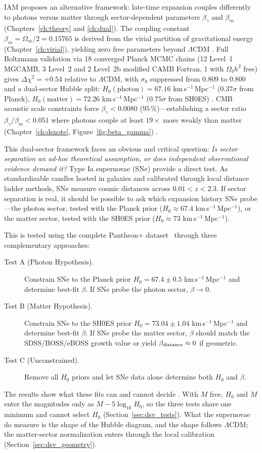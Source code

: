 IAM proposes an alternative framework: late-time expansion couples differently to photons versus matter through
sector-dependent parameters $\beta_\gamma$ and $\beta_m$ (Chapters~\ref{ch:theory} and \ref{ch:dual}). The coupling constant $\beta_m=\Omega_m/2=0.15765$
is derived from the virial partition of gravitational energy (Chapter~\ref{ch:virial}), yielding zero free parameters beyond $\Lambda$CDM \prediction.
Full Boltzmann validation via 18 converged Planck MCMC chains (12 Level~1 MGCAMB, 3 Level~2 and 2 Level~2b modified CAMB Fortran, 1 with $\Omega_bh^2$ free) gives $\Delta\chi^2=+0.54$ relative to
$\Lambda$CDM, with $\sigma_8$ suppressed from 0.809 to 0.800 and a dual-sector Hubble split: $H_0(\mathrm{photon})=67.16$ km\,s$^{-1}$\,Mpc$^{-1}$
($0.37\sigma$ from Planck), $H_0(\mathrm{matter})=72.26$ km\,s$^{-1}$\,Mpc$^{-1}$ ($0.75\sigma$ from SH0ES) \measured. CMB acoustic scale constraints
force $\beta_\gamma<0.0080$ ($95\,\%$)---establishing a sector ratio $\beta_\gamma/\beta_m<0.051$ where photons couple at least $19\times$ more weakly
than matter (Chapter~\ref{ch:dsnote}, Figure~\ref{fig:beta_gamma}) \calc.

This dual-sector framework faces an obvious and critical question: \emph{Is sector separation an ad-hoc theoretical assumption, or does independent
observational evidence demand it?} Type Ia supernovae (SNe) provide a direct test. As standardizable candles hosted in galaxies and calibrated through
local distance ladder methods, SNe measure cosmic distances across $0.01<z<2.3$. If sector separation is real, it should be possible to ask which
expansion history SNe probe---the photon sector, tested with the Planck prior ($H_0\approx67.4$ km\,s$^{-1}$\,Mpc$^{-1}$), or the matter sector, tested with the SH0ES prior ($H_0\approx73$ km\,s$^{-1}$\,Mpc$^{-1}$).

This is tested using the complete Pantheon+ dataset~\cite{Brout2022,Scolnic2022} through three complementary approaches:
\begin{description}
\item[Test A (Photon Hypothesis).] Constrain SNe to the Planck prior $H_0=67.4\pm0.5$ km\,s$^{-1}$\,Mpc$^{-1}$ and determine best-fit $\beta$.
If SNe probe the photon sector, $\beta\to0$.
\item[Test B (Matter Hypothesis).] Constrain SNe to the SH0ES prior $H_0=73.04\pm1.04$ km\,s$^{-1}$\,Mpc$^{-1}$ and determine best-fit $\beta$.
If SNe probe the matter sector, $\beta$ should match the SDSS/BOSS/eBOSS growth value or yield $\beta_{\rm distance}\approx0$ if geometric.
\item[Test C (Unconstrained).] Remove all $H_0$ priors and let SNe data alone determine both $H_0$ and $\beta$.
\end{description}
The results show what these fits can and cannot decide \derived. With $M$ free, $H_0$ and $M$ enter the magnitudes only as $M-5\log_{10}H_0$, so the
three tests share one minimum and cannot select $H_0$ (Section~\ref{sec:dsv_tests}). What the supernovae do measure is the shape of the Hubble diagram,
and the shape follows $\Lambda$CDM; the matter-sector normalization enters through the local calibration (Section~\ref{sec:dsv_geometry}).

